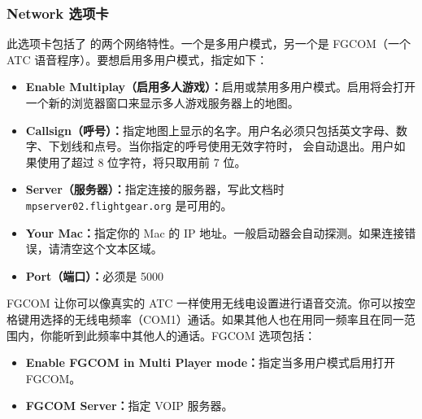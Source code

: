 \ifchinese
\subsubsection{Network 选项卡}
此选项卡包括了 \FlightGear{} 的两个网络特性。一个是多用户模式，另一个是 FGCOM（一个 ATC 语音程序）。要想启用多用户模式，指定如下：
\begin{itemize}
\item \textbf{Enable Multiplay（启用多人游戏）：}启用或禁用多用户模式。启用将会打开一个新的浏览器窗口来显示多人游戏服务器上的地图。
\item \textbf{Callsign（呼号）：}指定地图上显示的名字。用户名必须只包括英文字母、数字、下划线和点号。当你指定的呼号使用无效字符时，\FlightGear{} 会自动退出。用户如果使用了超过 8 位字符，将只取用前 7 位。
\item \textbf{Server（服务器）：}指定连接的服务器，写此文档时 \texttt{mpserver02.flightgear.org} 是可用的。
\item \textbf{Your Mac：}指定你的 Mac 的 IP 地址。一般启动器会自动探测。如果连接错误，请清空这个文本区域。
\item \textbf{Port（端口）：}必须是 5000
\end{itemize}

FGCOM 让你可以像真实的 ATC 一样使用无线电设置进行语音交流。你可以按空格键用选择的无线电频率（COM1）通话。如果其他人也在用同一频率且在同一范围内，你能听到此频率中其他人的通话。FGCOM 选项包括：

\begin{itemize}
\item \textbf{Enable FGCOM in Multi Player mode：}指定当多用户模式启用打开 FGCOM。
\item \textbf{FGCOM Server：}指定 VOIP 服务器。
\end{itemize}

